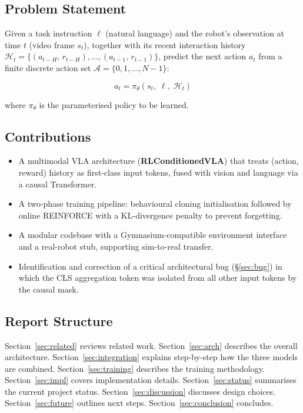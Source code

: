 \documentclass[12pt, a4paper]{article}
\begin{document}
\subsection{Problem Statement}

Given a task instruction $\ell$ (natural language) and the robot's observation
at time $t$ (video frame $s_t$), together with its recent interaction history
$\mathcal{H}_t = \{(a_{t-H},\,r_{t-H}),\ldots,(a_{t-1},\,r_{t-1})\}$,
predict the next action $a_t$ from a finite discrete action set
$\mathcal{A} = \{0, 1, \ldots, N-1\}$:

\[
  a_t = \pi_\theta\!\left(s_t,\;\ell,\;\mathcal{H}_t\right)
\]

where $\pi_\theta$ is the parameterised policy to be learned.

\subsection{Contributions}

\begin{itemize}[leftmargin=1.5em]
  \item A multimodal VLA architecture (\textbf{RLConditionedVLA}) that
        treats (action, reward) history as first-class input tokens,
        fused with vision and language via a causal Transformer.
  \item A two-phase training pipeline: behavioural cloning initialisation
        followed by online REINFORCE with a KL-divergence penalty to
        prevent forgetting.
  \item A modular codebase with a Gymnasium-compatible environment interface
        and a real-robot stub, supporting sim-to-real transfer.
  \item Identification and correction of a critical architectural bug
        (§\ref{sec:bug}) in which the CLS aggregation token was isolated from
        all other input tokens by the causal mask.
\end{itemize}

\subsection{Report Structure}

Section~\ref{sec:related} reviews related work.
Section~\ref{sec:arch} describes the overall architecture.
Section~\ref{sec:integration} explains step-by-step how the three models are
combined.
Section~\ref{sec:training} describes the training methodology.
Section~\ref{sec:impl} covers implementation details.
Section~\ref{sec:status} summarises the current project status.
Section~\ref{sec:discussion} discusses design choices.
Section~\ref{sec:future} outlines next steps.
Section~\ref{sec:conclusion} concludes.
\end{document}
